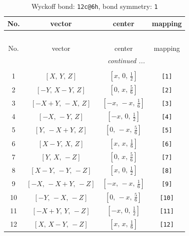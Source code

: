 \documentclass[fleqn,8pt]{jsarticle}
\begin{document}
\begin{longtable}{cccc}
\caption{Wyckoff bond: {\tt 12c@6h}, bond symmetry: {\tt 1}}
 \\
 \hline \hline
No. & vector & center & mapping \\ \hline \endfirsthead

\multicolumn{3}{l}{\tablename\ \thetable{}} \\
 \hline \hline
No. & vector & center & mapping \\ \hline \endhead

 \hline \hline
\multicolumn{3}{r}{\footnotesize\it continued ...} \\ \endfoot

 \hline \hline
\multicolumn{3}{r}{} \\ \endlastfoot

1 & $\left[ X,\, Y,\, Z \right]$ & $\left[ x,\, 0,\, \frac{1}{2} \right]$ & {\tt [1]} \\ \hline
2 & $\left[ - Y,\, X - Y,\, Z \right]$ & $\left[ 0,\, x,\, \frac{5}{6} \right]$ & {\tt [2]} \\ \hline
3 & $\left[ - X + Y,\, - X,\, Z \right]$ & $\left[ - x,\, - x,\, \frac{1}{6} \right]$ & {\tt [3]} \\ \hline
4 & $\left[ - X,\, - Y,\, Z \right]$ & $\left[ - x,\, 0,\, \frac{1}{2} \right]$ & {\tt [4]} \\ \hline
5 & $\left[ Y,\, - X + Y,\, Z \right]$ & $\left[ 0,\, - x,\, \frac{5}{6} \right]$ & {\tt [5]} \\ \hline
6 & $\left[ X - Y,\, X,\, Z \right]$ & $\left[ x,\, x,\, \frac{1}{6} \right]$ & {\tt [6]} \\ \hline
7 & $\left[ Y,\, X,\, - Z \right]$ & $\left[ 0,\, x,\, \frac{5}{6} \right]$ & {\tt [7]} \\ \hline
8 & $\left[ X - Y,\, - Y,\, - Z \right]$ & $\left[ x,\, 0,\, \frac{1}{2} \right]$ & {\tt [8]} \\ \hline
9 & $\left[ - X,\, - X + Y,\, - Z \right]$ & $\left[ - x,\, - x,\, \frac{1}{6} \right]$ & {\tt [9]} \\ \hline
10 & $\left[ - Y,\, - X,\, - Z \right]$ & $\left[ 0,\, - x,\, \frac{5}{6} \right]$ & {\tt [10]} \\ \hline
11 & $\left[ - X + Y,\, Y,\, - Z \right]$ & $\left[ - x,\, 0,\, \frac{1}{2} \right]$ & {\tt [11]} \\ \hline
12 & $\left[ X,\, X - Y,\, - Z \right]$ & $\left[ x,\, x,\, \frac{1}{6} \right]$ & {\tt [12]} \\
\end{longtable}
\end{document}
